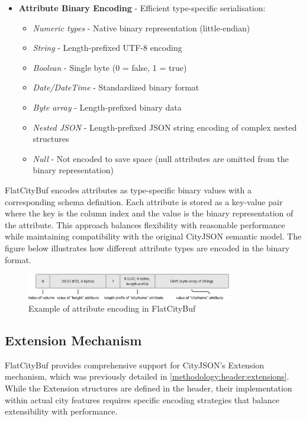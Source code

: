 \begin{itemize}
  \item \textbf{Attribute Binary Encoding} - Efficient type-specific serialisation:
    \begin{itemize}
      \item \textit{Numeric types} - Native binary representation (little-endian)
      \item \textit{String} - Length-prefixed UTF-8 encoding
      \item \textit{Boolean} - Single byte (0 = false, 1 = true)
      \item \textit{Date/DateTime} - Standardized binary format
      \item \textit{Byte array} - Length-prefixed binary data
      \item \textit{Nested JSON} - Length-prefixed JSON string encoding of complex nested structures
      \item \textit{Null} - Not encoded to save space (null attributes are omitted from the binary representation)
    \end{itemize}
\end{itemize}

FlatCityBuf encodes attributes as type-specific binary values with a corresponding schema definition. Each attribute is stored as a key-value pair where the key is the column index and the value is the binary representation of the attribute. This approach balances flexibility with reasonable performance while maintaining compatibility with the original CityJSON semantic model. The figure below illustrates how different attribute types are encoded in the binary format.

\begin{figure}[htbp]
  \centering
  \includegraphics[width=0.8\textwidth]{figs/methodology/attribute_structure.png}
  \caption{Example of attribute encoding in FlatCityBuf}
  \label{methodology:feature_encoding:attribute_encoding:figure}
\end{figure}

\subsection{Extension Mechanism}
\label{methodology:feature_encoding:extension_mechanism}

FlatCityBuf provides comprehensive support for CityJSON's Extension mechanism, which was previously detailed in \autoref{methodology:header:extensions}. While the Extension structures are defined in the header, their implementation within actual city features requires specific encoding strategies that balance extensibility with performance.


